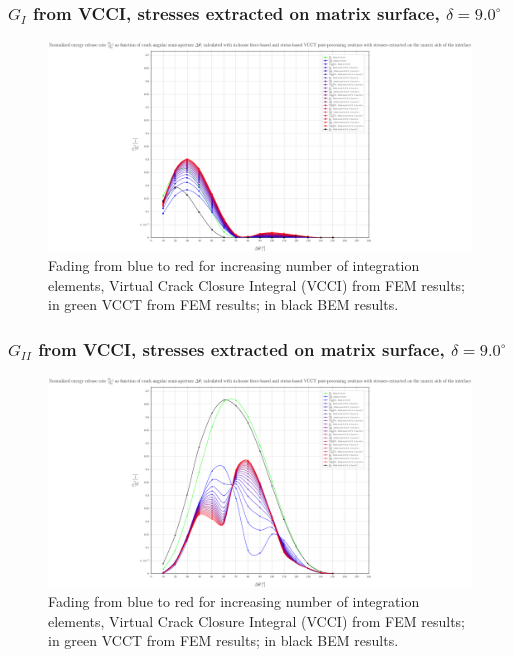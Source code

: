 \begin{frame}
\frametitle{\small $G_{I}$ from VCCI, stresses extracted on matrix surface, $\delta=9.0^{\circ}$}
\vspace{-0.75cm}
\centering
\captionsetup[figure]{font=scriptsize,labelfont=scriptsize}
\begin{figure}[!h]
\centering
\includegraphics[height=0.7\textheight]{2017-07-25_AbqRunSummary_SmallStrain_D09/pdf/2017-07-25_AbqRunSummary_SmallStrain_D09_F-SoM-VCCT_GI.pdf}
  \caption{\scriptsize Fading from blue to red for increasing number of integration elements, Virtual Crack Closure Integral (VCCI) from FEM results; in green VCCT from FEM results; in black BEM results.}
  \label{fig:res1}
\end{figure}
\end{frame}
\begin{frame}
\frametitle{\small $G_{II}$ from VCCI, stresses extracted on matrix surface, $\delta=9.0^{\circ}$}
\vspace{-0.75cm}
\centering
\captionsetup[figure]{font=scriptsize,labelfont=scriptsize}
\begin{figure}[!h]
\centering
\includegraphics[height=0.7\textheight]{2017-07-25_AbqRunSummary_SmallStrain_D09/pdf/2017-07-25_AbqRunSummary_SmallStrain_D09_F-SoM-VCCT_GII.pdf}
  \caption{\scriptsize Fading from blue to red for increasing number of integration elements, Virtual Crack Closure Integral (VCCI) from FEM results; in green VCCT from FEM results; in black BEM results.}
  \label{fig:res1}
\end{figure}
\end{frame}
